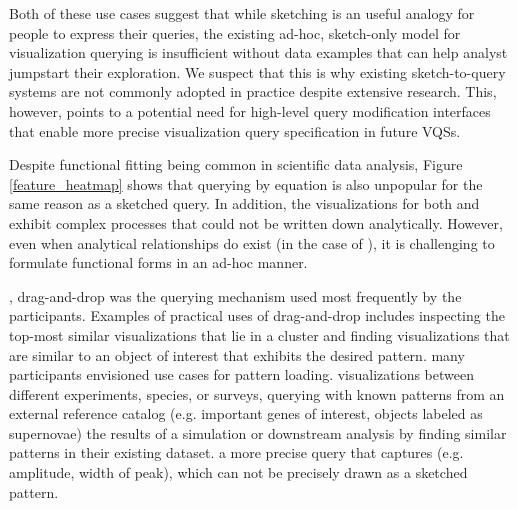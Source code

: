 {\par Both of these use cases suggest that while sketching is an useful analogy for people to express their queries, the existing ad-hoc, sketch-only model for visualization querying is insufficient without data examples that can help analyst jumpstart their exploration. We suspect that this is why existing sketch-to-query systems are not commonly adopted in practice despite extensive research. This, however, points to a potential need for high-level query modification interfaces that enable more precise visualization query specification in future VQSs.} %
\par Despite functional fitting being common in scientific data analysis, Figure \ref{feature_heatmap} shows that querying by equation is also unpopular for the same reason as a sketched query. In addition, the visualizations for both \astro and \bio exhibit complex processes that could not be written down  analytically. However, even when analytical relationships do exist (in the case of \matsci), it is challenging to formulate functional forms in an  ad-hoc manner. %
\par {}, drag-and-drop was the querying mechanism used most frequently by the participants. Examples of practical uses of drag-and-drop includes inspecting the top-most similar visualizations that lie in a cluster and finding visualizations that are similar to an object of interest that exhibits the desired pattern.  many participants envisioned use cases for pattern loading.  visualizations between different experiments, species, or surveys, querying with known patterns from an external reference catalog (e.g. important genes of interest, objects labeled as supernovae)  the results of a simulation or downstream analysis by finding similar patterns in their existing dataset.  a more precise query that captures  (e.g. amplitude, width of peak), which can not be precisely drawn as a sketched pattern. 
